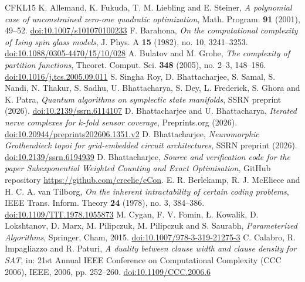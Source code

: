 \begin{thebibliography}{CFKL15}
 K. Allemand, K. Fukuda, T. M. Liebling and E. Steiner, \emph{A polynomial case of unconstrained zero-one quadratic optimization}, Math. Program. \textbf{91} (2001), 49--52. \href{https://doi.org/10.1007/s101070100233}{doi:10.1007/s101070100233}
 F. Barahona, \emph{On the computational complexity of Ising spin glass models}, J. Phys. A \textbf{15} (1982), no. 10, 3241--3253. \href{https://doi.org/10.1088/0305-4470/15/10/028}{doi:10.1088/0305-4470/15/10/028}
 A. Bulatov and M. Grohe, \emph{The complexity of partition functions}, Theoret. Comput. Sci. \textbf{348} (2005), no. 2--3, 148--186. \href{https://doi.org/10.1016/j.tcs.2005.09.011}{doi:10.1016/j.tcs.2005.09.011}
 S. Singha Roy, D. Bhattacharjee, S. Samal, S. Nandi, N. Thakur, S. Sadhu, U. Bhattacharya, S. Dey, L. Frederick, S. Ghora and K. Patra, \emph{Quantum algorithms on symplectic state manifolds}, SSRN preprint (2026). \href{https://doi.org/10.2139/ssrn.6114107}{doi:10.2139/ssrn.6114107}
 D. Bhattacharjee and U. Bhattacharya, \emph{Iterated nerve complexes for $k$-fold sensor coverage}, Preprints.org (2026). \href{https://doi.org/10.20944/preprints202606.1351.v2}{doi:10.20944/preprints202606.1351.v2}
 D. Bhattacharjee, \emph{Neuromorphic Grothendieck topoi for grid-embedded circuit architectures}, SSRN preprint (2026). \href{https://doi.org/10.2139/ssrn.6194939}{doi:10.2139/ssrn.6194939}
 D. Bhattacharjee, \emph{Source and verification code for the paper Subexponential Weighted Counting and Exact Optimisation}, GitHub repository \url{https://github.com/creelie/eCon}\archiveline.
 E. R. Berlekamp, R. J. McEliece and H. C. A. van Tilborg, \emph{On the inherent intractability of certain coding problems}, IEEE Trans. Inform. Theory \textbf{24} (1978), no. 3, 384--386. \href{https://doi.org/10.1109/TIT.1978.1055873}{doi:10.1109/TIT.1978.1055873}
 M. Cygan, F. V. Fomin, {\L}. Kowalik, D. Lokshtanov, D. Marx, M. Pilipczuk, M. Pilipczuk and S. Saurabh, \emph{Parameterized Algorithms}, Springer, Cham, 2015. \href{https://doi.org/10.1007/978-3-319-21275-3}{doi:10.1007/978-3-319-21275-3}
 C. Calabro, R. Impagliazzo and R. Paturi, \emph{A duality between clause width and clause density for SAT}, in: 21st Annual IEEE Conference on Computational Complexity (CCC 2006), IEEE, 2006, pp. 252--260. \href{https://doi.org/10.1109/CCC.2006.6}{doi:10.1109/CCC.2006.6}

\end{thebibliography}
